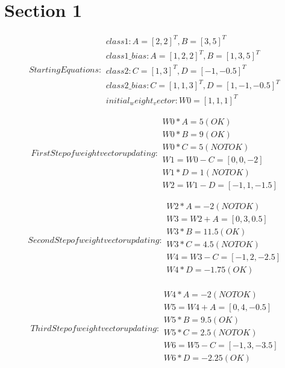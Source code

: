 \documentclass{report}
\begin{document}
\chapter{Section 1}

\begin{subequations}
  Starting Equations:
  \begin{flalign*}
    class1: A = [2, 2]^T, B = [3, 5]^T \\
    class1\_bias: A = [1, 2, 2]^T, B = [1, 3, 5]^T \\
    class2: C = [1, 3]^T, D = [-1, -0.5]^T \\
    class2\_bias: C = [1, 1, 3]^T, D = [1, -1, -0.5]^T \\
    initial_weight_vector: W0 = [1, 1, 1]^T
  \end{flalign*}
\end{subequations}


\begin{subequations}
  First Step of weight vector updating:
  \begin{flalign*}
    W0 * A = 5 (OK) \\
    W0 * B = 9 (OK) \\
    W0 * C = 5 (NOT OK) \\
    W1 = W0 - C = [0, 0, -2] \\
    W1 * D = 1 (NOT OK) \\
    W2 = W1 - D = [-1, 1, -1.5]
  \end{flalign*}
\end{subequations}

\begin{subequations}
  Second Step of weight vector updating:
  \begin{flalign*}
    W2 * A = -2 (NOT OK) \\
    W3 = W2 + A = [0, 3, 0.5] \\
    W3 * B = 11.5 (OK) \\
    W3 * C = 4.5 (NOT OK) \\
    W4 = W3 - C = [-1, 2, -2.5] \\
    W4 * D = -1.75 (OK) \\
  \end{flalign*}
\end{subequations}

\begin{subequations}
  Third Step of weight vector updating:
  \begin{flalign*}
    W4 * A = -2 (NOT OK) \\
    W5 = W4 + A = [0, 4, -0.5] \\
    W5 * B = 9.5 (OK) \\
    W5 * C = 2.5 (NOT OK) \\
    W6 = W5 - C = [-1, 3, -3.5] \\
    W6 * D = -2.25 (OK) \\
  \end{flalign*}
\end{subequations}
\end{document}
